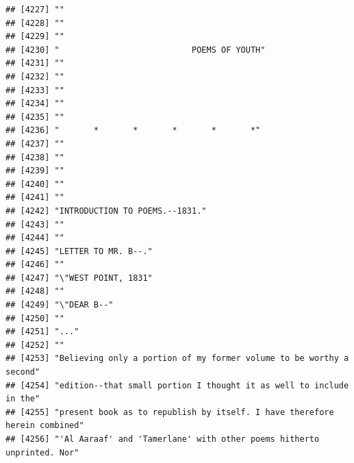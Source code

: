 \documentclass{article}\usepackage[]{graphicx}\usepackage[]{color}
\makeatletter
\newenvironment{kframe}{%
 \def\at@end@of@kframe{}%
 \ifinner\ifhmode%
  \def\at@end@of@kframe{\end{minipage}}%
  \begin{minipage}{\columnwidth}%
 \fi\fi%
 \def\FrameCommand##1{\hskip\@totalleftmargin \hskip-\fboxsep
 \colorbox{shadecolor}{##1}\hskip-\fboxsep
     \hskip-\linewidth \hskip-\@totalleftmargin \hskip\columnwidth}%
 \MakeFramed {\advance\hsize-\width
   \@totalleftmargin\z@ \linewidth\hsize
   \@setminipage}}%
 {\par\unskip\endMakeFramed%
 \at@end@of@kframe}
\newenvironment{knitrout}{}{} %
\makeatother
\begin{document}
\begin{knitrout}
\begin{kframe}
\begin{verbatim}
## [4227] ""                                                                            
## [4228] ""                                                                            
## [4229] ""                                                                            
## [4230] "                           POEMS OF YOUTH"                                   
## [4231] ""                                                                            
## [4232] ""                                                                            
## [4233] ""                                                                            
## [4234] ""                                                                            
## [4235] ""                                                                            
## [4236] "       *       *       *       *       *"                                    
## [4237] ""                                                                            
## [4238] ""                                                                            
## [4239] ""                                                                            
## [4240] ""                                                                            
## [4241] ""                                                                            
## [4242] "INTRODUCTION TO POEMS.--1831."                                               
## [4243] ""                                                                            
## [4244] ""                                                                            
## [4245] "LETTER TO MR. B--."                                                          
## [4246] ""                                                                            
## [4247] "\"WEST POINT, 1831"                                                          
## [4248] ""                                                                            
## [4249] "\"DEAR B--"                                                                  
## [4250] ""                                                                            
## [4251] "..."                                                                         
## [4252] ""                                                                            
## [4253] "Believing only a portion of my former volume to be worthy a second"          
## [4254] "edition--that small portion I thought it as well to include in the"          
## [4255] "present book as to republish by itself. I have therefore herein combined"    
## [4256] "'Al Aaraaf' and 'Tamerlane' with other poems hitherto unprinted. Nor"        

\end{verbatim}
\end{kframe}
\end{knitrout}
\end{document}
